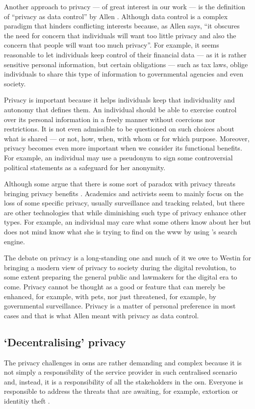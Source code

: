 \documentclass[showtrims,oldfontcommands]{kthesis}
\begin{document}
Another approach to privacy --- of great interest in our work --- is the definition 
of ``privacy as data control'' by Allen \cite{Allen99}. Although data control is 
a complex paradigm that hinders conflicting interests because, as Allen says, ``it 
obscures the need for concern that individuals will want too little privacy and 
also the concern that people will want too much privacy''. For example, it seems 
reasonable to let individuals keep control of their financial data --- as it is 
rather sensitive personal information, but certain obligations --- such as tax laws, 
oblige individuals to share this type of information to governmental agencies and 
even society.

Privacy is important because it helps individuals keep that individuality and autonomy 
that defines them. An individual should be able to exercise control over its personal 
information in a freely manner without coercions nor restrictions. It is not even 
admissible to be questioned on such choices about what is shared --- or not, how, 
when, with whom or for which purpose. Moreover, privacy becomes even more important 
when we consider its functional benefits. For example, an individual may use a pseudonym 
to sign some controversial political statements as a safeguard for her anonymity.

Although some argue that there is some sort of paradox with privacy threats bringing 
privacy benefits \cite{WittesL15}. Academics and activists seem to mainly focus 
on the loss of some specific privacy, usually surveillance and tracking related, 
but there are other technologies that while diminishing such type of privacy enhance 
other types. For example, an individual may care what some others know about her 
but does not mind \Google know what she is trying to find on the \ac{www} by using 
\Google's search engine.

The debate on privacy is a long-standing one and much of it we owe to Westin for 
bringing a modern view of privacy to society during the digital revolution, to some 
extent preparing the general public and lawmakers for the digital era to come. Privacy 
cannot be thought as a good or feature that can merely be enhanced, for example, 
with \acp{pet}, nor just threatened, for example, by governmental surveillance. 
Privacy is a matter of personal preference in most cases and that is what Allen 
meant with privacy as data control.

\subsection{`Decentralising' privacy}
    \label{subsection:decentralising-privacy}
The privacy challenges in \acp{osn} are rather demanding and complex because it is 
not simply a responsibility of the service provider in such centralised scenario 
and, instead, it is a responsibility of all the stakeholders in the \ac{osn}. Everyone  
is responsible to address the threats that are awaiting, for example, extortion 
or identitiy theft \cite{GrossAH05}. 
\end{document}
